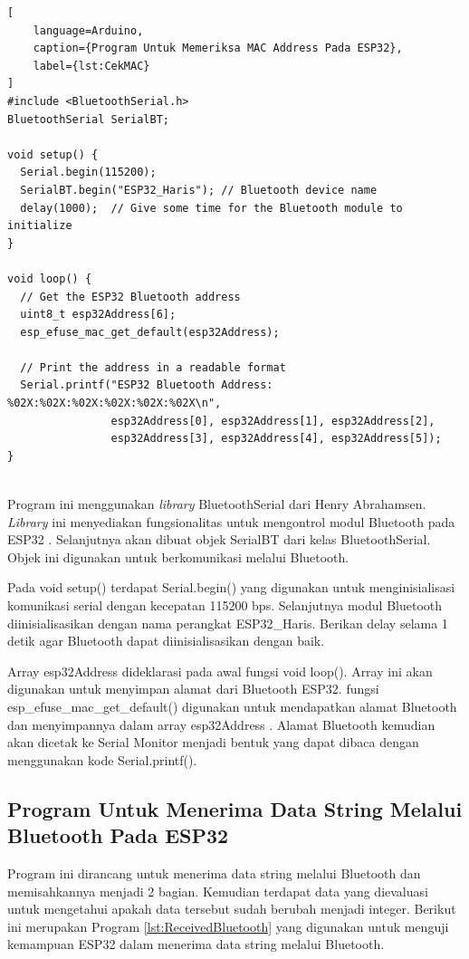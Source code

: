\begin{lstlisting}[
    language=Arduino,
    caption={Program Untuk Memeriksa MAC Address Pada ESP32},
    label={lst:CekMAC}
]
#include <BluetoothSerial.h>
BluetoothSerial SerialBT;

void setup() {
  Serial.begin(115200);
  SerialBT.begin("ESP32_Haris"); // Bluetooth device name
  delay(1000);  // Give some time for the Bluetooth module to initialize
}

void loop() {
  // Get the ESP32 Bluetooth address
  uint8_t esp32Address[6];
  esp_efuse_mac_get_default(esp32Address);

  // Print the address in a readable format
  Serial.printf("ESP32 Bluetooth Address: %02X:%02X:%02X:%02X:%02X:%02X\n",
                esp32Address[0], esp32Address[1], esp32Address[2],
                esp32Address[3], esp32Address[4], esp32Address[5]);
}
    
\end{lstlisting}

Program ini menggunakan \emph{library} BluetoothSerial dari Henry Abrahamsen. \emph{Library} ini menyediakan fungsionalitas untuk mengontrol modul Bluetooth pada ESP32 \parencite{Abrahamsen_2023}. Selanjutnya akan dibuat objek SerialBT dari kelas BluetoothSerial. Objek ini digunakan untuk berkomunikasi melalui Bluetooth. 

Pada void setup() terdapat Serial.begin() yang digunakan untuk menginisialisasi komunikasi serial dengan kecepatan 115200 bps. Selanjutnya modul Bluetooth diinisialisasikan dengan nama perangkat ESP32\_Haris. Berikan delay selama 1 detik agar Bluetooth dapat diinisialisasikan dengan baik.

Array esp32Address dideklarasi pada awal fungsi void loop(). Array ini akan digunakan untuk menyimpan alamat dari Bluetooth ESP32. fungsi esp\_efuse\_mac\_get\_default() digunakan untuk mendapatkan alamat Bluetooth dan menyimpannya dalam array esp32Address \parencite{Systems_2023}. Alamat Bluetooth kemudian akan dicetak ke Serial Monitor menjadi bentuk yang dapat dibaca dengan menggunakan kode Serial.printf(). 

\subsection{Program Untuk Menerima Data String Melalui Bluetooth Pada ESP32}

Program ini dirancang untuk menerima data string melalui Bluetooth dan memisahkannya menjadi 2 bagian. Kemudian terdapat data yang dievaluasi untuk mengetahui apakah data tersebut sudah berubah menjadi integer. Berikut ini merupakan Program \ref{lst:ReceivedBluetooth} yang digunakan untuk menguji kemampuan ESP32 dalam menerima data string melalui Bluetooth.

